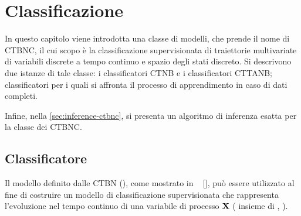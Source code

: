 
\chapter{Classificazione}
\label{cap:ctbnc}
In questo capitolo viene introdotta una classe di modelli, che prende il nome di \acf{CTBNC}, il cui scopo è la classificazione supervisionata di traiettorie multivariate di variabili discrete a tempo continuo e spazio degli stati discreto. Si descrivono due istanze di tale classe: i classificatori \acf{CTNB} e i classificatori \acf{CTTANB}; classificatori per i quali si affronta il processo di apprendimento in caso di dati completi.

Infine, nella \autoref{sec:inference-ctbnc}, si presenta un algoritmo di inferenza esatta per la classe dei \acs{CTBNC}.

\section{Classificatore}\label{sec:ctbnc}
Il modello definito dalle \acl{CTBN} (), come mostrato in ~\citeauthor{Stella2012} [\citeyear{Stella2012}], può essere utilizzato al fine di costruire un modello di classificazione supervisionata che rappresenta l'evoluzione nel tempo continuo di una variabile di processo $\mathbf{X}$ (\ie{} insieme di \mprocess{}, ).

